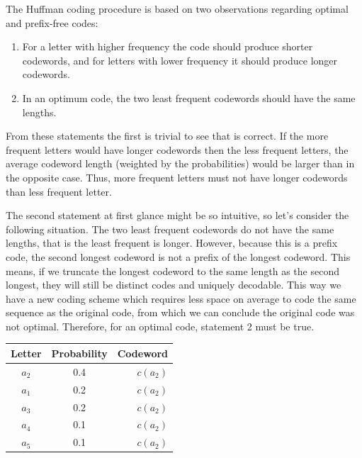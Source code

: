       The Huffman coding procedure is based on two observations regarding optimal and prefix-free codes:
      \begin{enumerate}
        \item For a letter with higher frequency the code should produce shorter codewords, and for letters with lower frequency it should produce longer codewords.
        \item In an optimum code, the two least frequent codewords should have the same lengths.
      \end{enumerate}

      From these statements the first is trivial to see that is correct. If the more frequent letters would have longer codewords then the less frequent letters, the average codeword length (weighted by the probabilities) would be larger than in the opposite case. Thus, more frequent letters must not have longer codewords than less frequent letter.

      The second statement at first glance might be so intuitive, so let's consider the following situation. The two least frequent codewords do not have the same lengths, that is the least frequent is longer. However, because this is a prefix code, the second longest codeword is not a prefix of the longest codeword. This means, if we truncate the longest codeword to the same length as the second longest, they will still be distinct codes and uniquely decodable. This way we have a new coding scheme which requires less space on average to code the same sequence as the original code, from which we can conclude the original code was not optimal. Therefore, for an optimal code, statement 2 must be true.

      \begin{table}
        \centering
        \begin{tabular}{ccr}
          \toprule
          Letter & Probability & Codeword \\
          \midrule
          $a_2$ & 0.4 & $c(a_2)$ \\
          $a_1$ & 0.2 & $c(a_2)$ \\
          $a_3$ & 0.2 & $c(a_2)$ \\
          $a_4$ & 0.1 & $c(a_2)$ \\
          $a_5$ & 0.1 & $c(a_2)$ \\
          \bottomrule
        \end{tabular}
        \label{tab:huffman1}
      \end{table}

